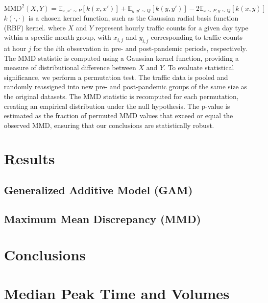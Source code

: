 \documentclass{article}
\begin{document}
$$
\text{MMD}^2(X, Y) = \mathbb{E}_{x, x' \sim P} [k(x, x')] + \mathbb{E}_{y, y' \sim Q} [k(y, y')] - 2\mathbb{E}_{x \sim P, y \sim Q} [k(x, y)]
$$
$k(\cdot, \cdot)$ is a chosen kernel function, such as the Gaussian radial basis function (RBF) kernel.
where $X$ and $Y$ represent hourly traffic counts for a given day type within a specific month group, with $x_{i,j}$ and $y_{i,j}$ corresponding to traffic counts at hour $j$ for the $i$th observation in pre- and post-pandemic periods, respectively. The MMD statistic is computed using a Gaussian kernel function, providing a measure of distributional difference between $X$ and $Y$.
To evaluate statistical significance, we perform a permutation test. The traffic data is pooled and randomly reassigned into new pre- and post-pandemic groups of the same size as the original datasets. The MMD statistic is recomputed for each permutation, creating an empirical distribution under the null hypothesis. The p-value is estimated as the fraction of permuted MMD values that exceed or equal the observed MMD, ensuring that our conclusions are statistically robust.
\section{Results}

\subsection{Generalized Additive Model (GAM)}

\subsection{Maximum Mean Discrepancy (MMD)}

\section{Conclusions}

\appendix

\section{Median Peak Time and Volumes}
\end{document}
